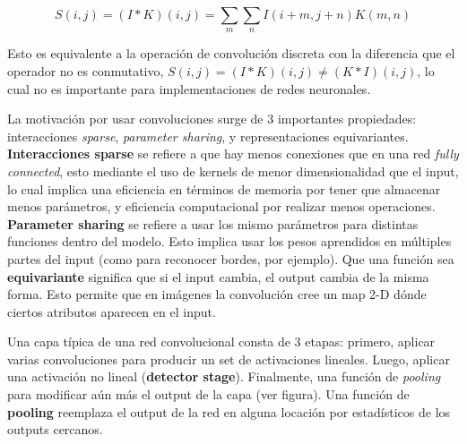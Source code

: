 \begin{equation}
S(i,j) = (I * K)(i,j) = \sum_{m}\sum_{n} I(i+m,j+n)K(m,n)
\end{equation}

Esto es equivalente a la operaci\'on de convoluci\'on discreta con la diferencia que el operador no es conmutativo, $S(i,j) = (I * K)(i,j) \neq (K * I)(i,j)$, lo cual no es importante para implementaciones de redes neuronales. 


La motivaci\'on por usar convoluciones surge de 3 importantes propiedades: interacciones \textit{sparse}, \textit{parameter sharing}, y representaciones equivariantes. \textbf{Interacciones sparse} se refiere a que hay menos conexiones que en una red \textit{fully connected}, esto mediante el uso de kernels de menor dimensionalidad que el input, lo cual implica una eficiencia en t\'erminos de memoria por tener que almacenar menos par\'ametros, y eficiencia computacional por realizar menos operaciones. \textbf{Parameter sharing} se refiere a usar los mismo par\'ametros para distintas funciones dentro del modelo. Esto implica usar los pesos aprendidos en m\'ultiples partes del input (como para reconocer bordes, por ejemplo). Que una funci\'on sea \textbf{equivariante} significa que si el input cambia, el output cambia de la misma forma. Esto permite que en im\'agenes la convoluci\'on cree un map 2-D d\'onde ciertos atributos aparecen en el input.

Una capa t\'ipica de una red convolucional consta de 3 etapas: primero, aplicar varias convoluciones para producir un set de activaciones lineales. Luego, aplicar una activaci\'on no lineal (\textbf{detector stage}). Finalmente, una funci\'on de \textit{pooling} para modificar a\'un m\'as el output de la capa (ver figura). Una funci\'on de \textbf{pooling} reemplaza el output de la red en alguna locaci\'on por estad\'isticos de los outputs cercanos. 

